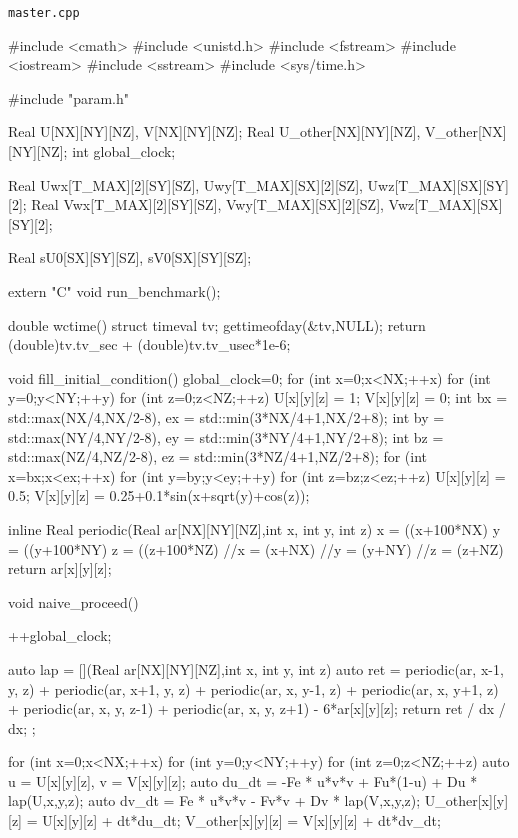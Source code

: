 \verb`master.cpp`
\begin{code}
#include <cmath>
#include <unistd.h>
#include <fstream>
#include <iostream>
#include <sstream>
#include <sys/time.h>

#include "param.h"



Real U[NX][NY][NZ], V[NX][NY][NZ];
Real U_other[NX][NY][NZ], V_other[NX][NY][NZ];
int global_clock;


Real Uwx[T_MAX][2][SY][SZ], Uwy[T_MAX][SX][2][SZ], Uwz[T_MAX][SX][SY][2];
Real Vwx[T_MAX][2][SY][SZ], Vwy[T_MAX][SX][2][SZ], Vwz[T_MAX][SX][SY][2];

Real sU0[SX][SY][SZ], sV0[SX][SY][SZ];


extern "C" {
  void run_benchmark();
}

double wctime() {
  struct timeval tv;
  gettimeofday(&tv,NULL);
  return (double)tv.tv_sec + (double)tv.tv_usec*1e-6;
}



void fill_initial_condition() {
  global_clock=0;
  for (int x=0;x<NX;++x) {
    for (int y=0;y<NY;++y) {
      for (int z=0;z<NZ;++z) {
        U[x][y][z] = 1;
        V[x][y][z] = 0;
      }
    }
  }
  int bx = std::max(NX/4,NX/2-8),  ex = std::min(3*NX/4+1,NX/2+8);
  int by = std::max(NY/4,NY/2-8),  ey = std::min(3*NY/4+1,NY/2+8);
  int bz = std::max(NZ/4,NZ/2-8),  ez = std::min(3*NZ/4+1,NZ/2+8);
  for (int x=bx;x<ex;++x){
    for (int y=by;y<ey;++y){
      for (int z=bz;z<ez;++z){
        U[x][y][z] = 0.5;
        V[x][y][z] = 0.25+0.1*sin(x+sqrt(y)+cos(z));
      }
    }
  }
}


inline Real periodic(Real ar[NX][NY][NZ],int x, int y, int z) {
  x = ((x+100*NX)%
  y = ((y+100*NY)%
  z = ((z+100*NZ)%
  //x = (x+NX)%
  //y = (y+NY)%
  //z = (z+NZ)%
  return ar[x][y][z];
}


void naive_proceed() {
  ++global_clock;

  auto lap = [](Real ar[NX][NY][NZ],int x, int y, int z) {
    auto ret = periodic(ar, x-1, y, z) + periodic(ar, x+1, y, z)
    + periodic(ar, x, y-1, z) + periodic(ar, x, y+1, z)
    + periodic(ar, x, y, z-1) + periodic(ar, x, y, z+1)
    - 6*ar[x][y][z];
    return ret / dx / dx;
  };

  for (int x=0;x<NX;++x) {
    for (int y=0;y<NY;++y) {
      for (int z=0;z<NZ;++z) {
        auto u = U[x][y][z],  v = V[x][y][z];
        auto du_dt = -Fe * u*v*v + Fu*(1-u) + Du * lap(U,x,y,z);
        auto dv_dt =  Fe * u*v*v - Fv*v     + Dv * lap(V,x,y,z);
        U_other[x][y][z] = U[x][y][z] + dt*du_dt;
        V_other[x][y][z] = V[x][y][z] + dt*dv_dt;
      }
    }
  }

}
\end{code}
